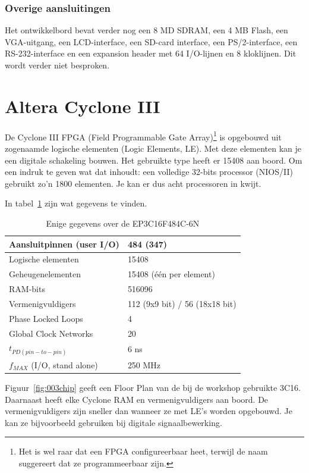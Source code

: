 \documentclass[a4paper,12pt,fleqn,twoside]{book}
\begin{document}
\subsubsection{Overige aansluitingen}
Het ontwikkelbord bevat verder nog een 8 MD SDRAM, een 4 MB Flash, een
VGA-uitgang, een LCD-interface, een SD-card interface, een PS/2-interface, een
RS-232-interface en een expansion header met 64 I/O-lijnen en 8 kloklijnen. Dit
wordt verder niet besproken.


\section{Altera Cyclone III}
\label{sec:alteracycloneiii}
De Cyclone III FPGA (Field Programmable Gate Array)\footnote{Het is wel raar
dat een FPGA configureerbaar heet, terwijl de naam suggereert dat ze
programmeerbaar zijn.} is opgebouwd uit zogenaamde logische elementen (Logic
Elements, LE). Met deze elementen kan je een digitale schakeling bouwen. Het 
gebruikte type heeft er 15408 aan boord. Om een indruk te geven wat dat
inhoudt: een volledige 32-bits processor (NIOS/II) gebruikt zo'n 1800
elementen. Je kan er dus acht processoren in kwijt.

In tabel~\ref{tab:gegevenscyclone} zijn wat gegevens te vinden.
\begin{table}[H]
\caption{Enige gegevens over de EP3C16F484C-6N}
\label{tab:gegevenscyclone}
\centering
\begin{tabular}{|l|l|}
\hline 
Aansluitpinnen (user I/O) & 484 (347) \\ 
\hline 
Logische elementen & 15408 \\ 
\hline 
Geheugenelementen & 15408 (\'{e}\'{e}n per element) \\ 
\hline 
RAM-bits & 516096 \\ 
\hline 
Vermenigvuldigers & 112 (9x9 bit) / 56 (18x18 bit) \\ 
\hline 
Phase Locked Loops & 4 \\ 
\hline 
Global Clock Networks & 20 \\ 
\hline 
$t_{PD(pin-to-pin)}$ & 6 ns \\ 
\hline 
$f_{MAX}$ (I/O, stand alone) & 250 MHz \\ 
\hline 
\end{tabular} 
\end{table}

Figuur~\ref{fig:003chip} geeft een Floor Plan van de bij de workshop gebruikte
3C16. Daarnaast heeft elke Cyclone RAM en vermenigvuldigers aan boord. De
vermenigvuldigers zijn sneller dan wanneer ze met LE's worden opgebouwd.
Je kan ze bijvoorbeeld gebruiken bij digitale signaalbewerking.
\end{document}
